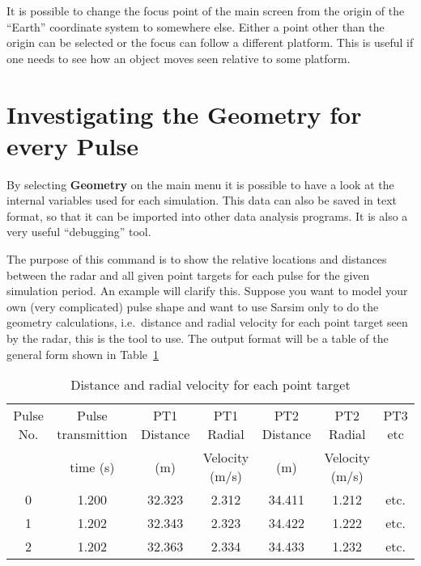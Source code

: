 \label{focuspoint}It is possible to change the focus point of the main
screen from the origin of the ``Earth'' coordinate system to somewhere else.
Either a point other than the origin can be selected or the focus can follow
a different platform. This is useful if one needs to see how an object moves
seen relative to some platform.

\section{Investigating the Geometry for every Pulse}

By selecting \textbf{Geometry} on the main menu it is possible to have a
look at the internal variables used for each simulation. This data can also
be saved in text format, so that it can be imported into other data analysis
programs. It is also a very useful ``debugging'' tool.

The purpose of this command is to show the relative locations and distances
between the radar and all given point targets for each pulse for the given
simulation period. An example will clarify this. Suppose you want to model
your own (very complicated) pulse shape and want to use Sarsim only to do
the geometry calculations, i.e.~distance and radial velocity for each point
target seen by the radar, this is the tool to use. The output format will be
a table of the general form shown in Table~\ref{tab:two}

\begin{table}[tbp] \centering%
\begin{tabular}{|c|c|c|c|c|c|c|}
\hline
{\tiny Pulse No.} & {\tiny Pulse transmittion} & {\tiny PT1 Distance} & 
{\tiny PT1 Radial} & {\tiny PT2 Distance} & {\tiny PT2 Radial} & {\tiny PT3
etc} \\ 
& {\tiny time (s)} & {\tiny (m)} & {\tiny Velocity (m/s)} & {\tiny (m)} & 
{\tiny Velocity (m/s)} &  \\ \hline
{\tiny 0} & {\tiny 1.200} & {\tiny 32.323} & {\tiny 2.312} & {\tiny 34.411}
& {\tiny 1.212} & {\tiny etc.} \\ \hline
{\tiny 1} & {\tiny 1.202} & {\tiny 32.343} & {\tiny 2.323} & {\tiny 34.422}
& {\tiny 1.222} & {\tiny etc.} \\ \hline
{\tiny 2} & {\tiny 1.202} & {\tiny 32.363} & {\tiny 2.334} & {\tiny 34.433}
& {\tiny 1.232} & {\tiny etc.} \\ \hline
\end{tabular}
\caption{Distance and radial velocity for each point target\label{tab:two}}%
\end{table}%

